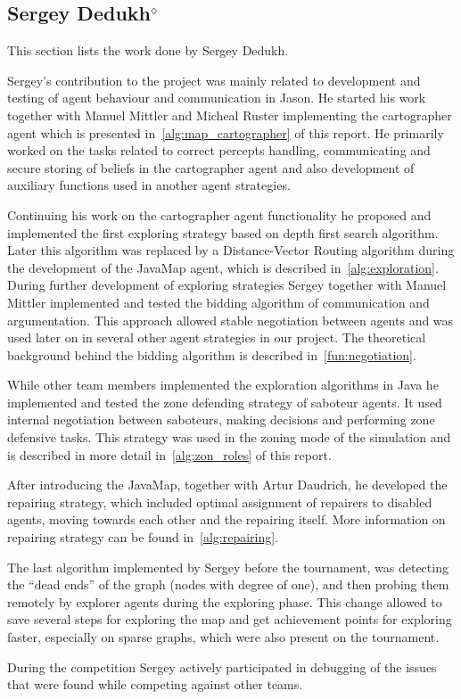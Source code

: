 \subsection[Sergey Dedukh]{Sergey Dedukh$^{\diamond}$}
This section lists the work done by Sergey Dedukh.

Sergey's contribution to the project was mainly related to development and testing of agent behaviour and communication in Jason.
He started his work together with Manuel Mittler and Micheal Ruster implementing the cartographer agent which is presented in~\autoref{alg:map_cartographer} of this report.
He primarily worked on the tasks related to correct percepts handling, communicating and secure storing of beliefs in the cartographer agent and also development of auxiliary functions used in another agent strategies.

Continuing his work on the cartographer agent functionality he proposed and implemented the first exploring strategy based on depth first search algorithm.
Later this algorithm was replaced by a Distance-Vector Routing algorithm during the development of the JavaMap agent, which is described in~\autoref{alg:exploration}.
During further development of exploring strategies Sergey together with Manuel Mittler implemented and tested the bidding algorithm of communication and argumentation.
This approach allowed stable negotiation between agents and was used later on in several other agent strategies in our project.
The theoretical background behind the bidding algorithm is described in~\autoref{fun:negotiation}.

While other team members implemented the exploration algorithms in Java he implemented and tested the zone defending strategy of saboteur agents.
It used internal negotiation between saboteurs, making decisions and performing zone defensive tasks.
This strategy was used in the zoning mode of the simulation and is described in more detail in~\autoref{alg:zon_roles} of this report.

After introducing the JavaMap, together with Artur Daudrich, he developed the repairing strategy, which included optimal assignment of repairers to disabled agents, moving towards each other and the repairing itself.
More information on repairing strategy can be found in~\autoref{alg:repairing}.

The last algorithm implemented by Sergey before the tournament, was detecting the ``dead ends'' of the graph (nodes with degree of one), and then probing them remotely by explorer agents during the exploring phase. This change allowed to save several steps for exploring the map and get achievement points for exploring faster, especially on sparse graphs, which were also present on the tournament.

During the competition Sergey actively participated in debugging of the issues that were found while competing against other teams. 